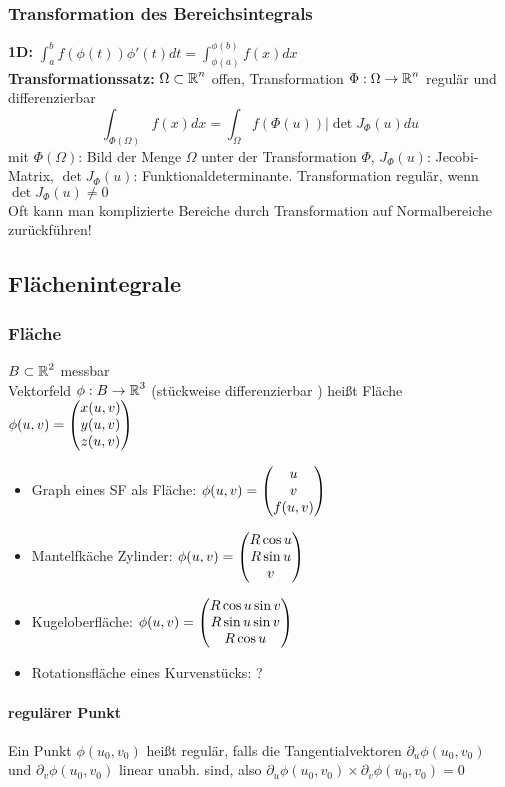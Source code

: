\documentclass[german]{latex4ei/latex4ei_sheet}
\begin{document}
\subsubsection{Transformation des Bereichsintegrals}
\textbf{1D:} $\int_a^b f(\phi(t))\phi'(t)d t=\int_{\phi(a)}^{\phi(b)} f(x) dx$\\
\textbf{Transformationssatz:} $\Omega \subset \operatorname{\mathbb R}^n$ offen, Transformation $\Phi: \Omega \to \operatorname{\mathbb R}^n$ regul\"ar und differenzierbar\\
\[\int_{\Phi(\Omega)} f(x) d x=\int_{\Omega} f(\Phi(u))|\det J_{\Phi}(u) d u\] mit $\Phi(\Omega)$: Bild der Menge $\Omega$ unter der Transformation $\Phi$, $J_\Phi(u)$: Jecobi-Matrix, $\det J_\Phi(u)$: Funktionaldeterminante. Transformation regul\"ar, wenn $\det J_\Phi(u)\neq 0$\\
Oft kann man komplizierte Bereiche durch Transformation auf Normalbereiche zur\"uckf\"uhren!

\subsection{Fl\"achenintegrale}
\subsubsection{Fl\"ache}
$B \subset \operatorname{\mathbb R}^2$ messbar\\
Vektorfeld $\phi:B \to \operatorname{\mathbb R}^3$ (st\"uckweise differenzierbar ) hei\ss{}t Fl\"ache\\
$\phi(u,v)=\begin{pmatrix} x(u,v)\\y(u,v)\\z(u,v) \end{pmatrix}$\\
\begin{itemize}
\item Graph eines SF als Fl\"ache: $\phi(u,v)=\begin{pmatrix} u\\v\\f(u,v) \end{pmatrix}$
\item Mantelfk\"ache Zylinder: $\phi(u,v)=\begin{pmatrix} R \cos u \\ R \sin u \\ v \end{pmatrix}$
\item Kugeloberfl\"ache: $\phi(u,v)=\begin{pmatrix} R \cos u \sin v\\R \sin u \sin v \\ R \cos u \end{pmatrix}$
\item Rotationsfl\"ache eines Kurvenst\"ucks: ?
\end{itemize}
\paragraph{regul\"arer Punkt}
Ein Punkt $\phi(u_0,v_0)$ hei\ss{}t regul\"ar, falls die Tangentialvektoren $\partial_u \phi(u_0,v_0)$ und $\partial_v \phi(u_0,v_0)$ linear unabh. sind, also $\partial_u \phi(u_0,v_0)\times \partial_v \phi(u_0,v_0)=0$
\end{document}
